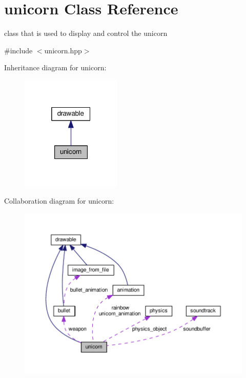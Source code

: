 \hypertarget{classunicorn}{}\section{unicorn Class Reference}
\label{classunicorn}


class that is used to display and control the unicorn  




{\ttfamily \#include $<$unicorn.\+hpp$>$}



Inheritance diagram for unicorn\+:\nopagebreak
\begin{figure}[H]
\begin{center}
\leavevmode
\includegraphics[width=136pt]{classunicorn__inherit__graph}
\end{center}
\end{figure}


Collaboration diagram for unicorn\+:\nopagebreak
\begin{figure}[H]
\begin{center}
\leavevmode
\includegraphics[width=350pt]{classunicorn__coll__graph}
\end{center}
\end{figure}
